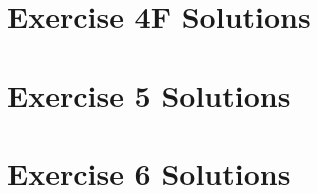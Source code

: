 \documentclass[]{book}
\theoremstyle{definition}
\theoremstyle{definition}
\theoremstyle{definition}
\theoremstyle{remark}
\begin{document}
\hypertarget{ex4f-answers}{\section*{Exercise 4F
Solutions}\label{ex4f-answers}}

\hypertarget{ex5-answers}{\section*{Exercise 5
Solutions}\label{ex5-answers}}

\section*{Exercise 6 Solutions}\label{ex6-answers}


\end{document}
